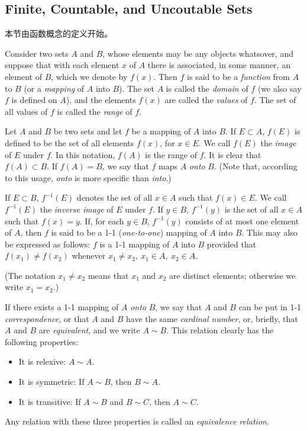 \documentclass[../poma-note.tex]{subfiles}
\begin{document}
\subsection*{Finite, Countable, and Uncoutable Sets}

本节由函数概念的定义开始。

\begin{definition}
  Consider two sets $A$ and $B$, whose elements may be any objects whatsover, and suppose that with each
  element $x$ of $A$ there is associated, in some manner, an element of $B$, which we denote by $f(x)$.
  Then $f$ is said to be a \textit{function} from $A$ to $B$ (or a \textit{mapping} of $A$ into $B$).
  The set $A$ is called the \textit{domain} of $f$ (we also say $f$ is defined on $A$), and the elements $f(x)$
  are called the \textit{values} of $f$. The set of all values of $f$ is called the \textit{range} of $f$.
\end{definition}

\begin{definition}
  Let $A$ and $B$ be two sets and let $f$ be a mapping of $A$ into $B$. If $E \subset A$, $f(E)$ is defined to
  be the set of all elements $f(x)$, for $x \in E$. We call $f(E)$ the \textit{image} of $E$ under $f$.
  In this notation, $f(A)$ is the range of $f$. It is clear that $f(A) \subset B$. If $f(A)=B$, we say that $f$
  maps $A$ \textit{onto} $B$. (Note that, according to this usage, \textit{onto} is more specific than \textit{into}.)

  If $E \subset B$, $f^{-1}(E)$ denotes the set of all $x \in A$ such that $f(x) \in E$. We call $f^{-1}(E)$ the
  \textit{inverse image} of $E$ under $f$. If $y \in B$, $f^{-1}(y)$ is the set of all $x \in A$ such that
  $f(x)=y$. If, for each $y \in B$, $f^{-1}(y)$ consists of at most one element of $A$, then $f$ is said to be
  a 1-1 (\textit{one-to-one}) mapping of $A$ into $B$. This may also be expressed as follows: $f$ is a 1-1 mapping
  of $A$ into $B$ provided that $f(x_1) \ne f(x_2)$ whenever $x_1 \ne x_2,\ x_1 \in A,\ x_2 \in A$.

  (The notation $x_1 \ne x_2$ means that $x_1$ and $x_2$ are distinct elements; otherwise we write $x_1=x_2$.)
\end{definition}

\begin{definition}
  If there exists a 1-1 mapping of $A$ \textit{onto} $B$, we say that $A$ and $B$ can be put in 1-1 \textit{correspondence},
  or that $A$ and $B$ have the same \textit{cardinal number}, or, briefly, that $A$ and $B$ are \textit{equivalent},
  and we write $A \sim B$. This relation clearly has the following properties:
  \begin{itemize}
    \item[] It is relexive: $A \sim A$.
    \item[] It is symmetric: If $A \sim B$, then $B \sim A$.
    \item[] It is transitive: If $A \sim B$ and $B \sim C$, then $A \sim C$.
  \end{itemize}
  Any relation with these three properties is called an \textit{equivalence relation}.
\end{definition}
\end{document}
